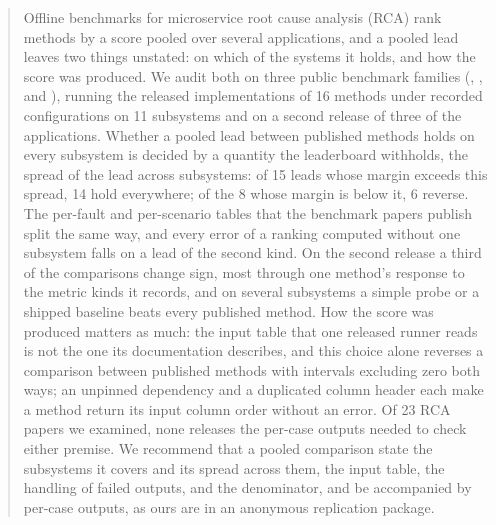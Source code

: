 \begin{abstract}
Offline benchmarks for microservice root cause analysis (RCA) rank methods by a score pooled over several applications, and a pooled lead leaves two things unstated: on which of the systems it holds, and how the score was produced.
We audit both on three public benchmark families (\openrca, \rcaeval, and \petshop), running the released implementations of 16 methods under recorded configurations on 11 subsystems and on a second release of three of the applications.
Whether a pooled lead between published methods holds on every subsystem is decided by a quantity the leaderboard withholds, the spread of the lead across subsystems: of 15 leads whose margin exceeds this spread, 14 hold everywhere; of the 8 whose margin is below it, 6 reverse.
The per-fault and per-scenario tables that the benchmark papers publish split the same way, and every error of a ranking computed without one subsystem falls on a lead of the second kind.
On the second release a third of the comparisons change sign, most through one method's response to the metric kinds it records, and on several subsystems a simple probe or a shipped baseline beats every published method.
How the score was produced matters as much: the input table that one released runner reads is not the one its documentation describes, and this choice alone reverses a comparison between published methods with intervals excluding zero both ways; an unpinned dependency and a duplicated column header each make a method return its input column order without an error.
Of 23 RCA papers we examined, none releases the per-case outputs needed to check either premise.
We recommend that a pooled comparison state the subsystems it covers and its spread across them, the input table, the handling of failed outputs, and the denominator, and be accompanied by per-case outputs, as ours are in an anonymous replication package.
\end{abstract}
